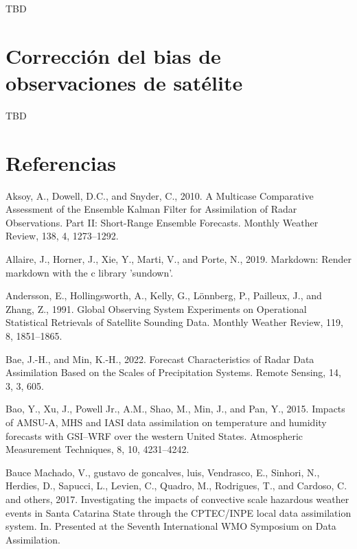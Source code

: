 \documentclass[12pt,oneside]{reedthesis}
\begin{document}
TBD

\appendix

\hypertarget{correcciuxf3n-del-bias-de-observaciones-de-satuxe9lite}{%
\chapter{Corrección del bias de observaciones de satélite}\label{correcciuxf3n-del-bias-de-observaciones-de-satuxe9lite}}

TBD

\backmatter

\hypertarget{referencias}{%
\chapter*{Referencias}\label{referencias}}


\noindent

\setlength{\parindent}{-0.20in}

\hypertarget{refs}{}
\leavevmode\hypertarget{ref-aksoy2010}{}%
Aksoy, A., Dowell, D.C., and Snyder, C., 2010. A Multicase Comparative Assessment of the Ensemble Kalman Filter for Assimilation of Radar Observations. Part II: Short-Range Ensemble Forecasts. Monthly Weather Review, 138, 4, 1273--1292.

\leavevmode\hypertarget{ref-allaire2019}{}%
Allaire, J., Horner, J., Xie, Y., Marti, V., and Porte, N., 2019. Markdown: Render markdown with the c library 'sundown'.

\leavevmode\hypertarget{ref-andersson1991}{}%
Andersson, E., Hollingsworth, A., Kelly, G., Lönnberg, P., Pailleux, J., and Zhang, Z., 1991. Global Observing System Experiments on Operational Statistical Retrievals of Satellite Sounding Data. Monthly Weather Review, 119, 8, 1851--1865.

\leavevmode\hypertarget{ref-bae2022}{}%
Bae, J.-H., and Min, K.-H., 2022. Forecast Characteristics of Radar Data Assimilation Based on the Scales of Precipitation Systems. Remote Sensing, 14, 3, 3, 605.

\leavevmode\hypertarget{ref-bao2015}{}%
Bao, Y., Xu, J., Powell Jr., A.M., Shao, M., Min, J., and Pan, Y., 2015. Impacts of AMSU-A, MHS and IASI data assimilation on temperature and humidity forecasts with GSI--WRF over the western United States. Atmospheric Measurement Techniques, 8, 10, 4231--4242.

\leavevmode\hypertarget{ref-baucemachado2017}{}%
Bauce Machado, V., gustavo de goncalves, luis, Vendrasco, E., Sinhori, N., Herdies, D., Sapucci, L., Levien, C., Quadro, M., Rodrigues, T., and Cardoso, C. and others, 2017. Investigating the impacts of convective scale hazardous weather events in Santa Catarina State through the CPTEC/INPE local data assimilation system. In. Presented at the Seventh International WMO Symposium on Data Assimilation.
\end{document}
